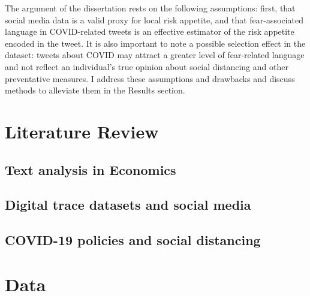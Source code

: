 \documentclass{article}
\begin{document}
The argument of the dissertation rests on the following assumptions: first, that social media data is a valid proxy for local risk appetite, and that fear-associated language in COVID-related tweets is an effective estimator of the risk appetite encoded in the tweet. It is also important to note a possible selection effect in the dataset: tweets about COVID may attract a greater level of fear-related language and not reflect an individual's true opinion about social distancing and other preventative measures. I address these assumptions and drawbacks and discuss methods to alleviate them in the Results section.


\section{Literature Review}%
\subsection{Text analysis in Economics}
\subsection{Digital trace datasets and social media}
\subsection{COVID-19 policies and social distancing}

\section{Data} %
\end{document}
